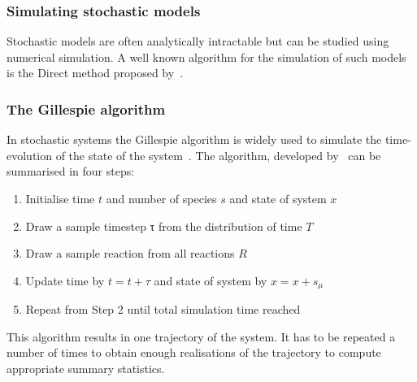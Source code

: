 
\subsubsection{Simulating stochastic models}

Stochastic models are often analytically intractable but can be studied using numerical simulation. A well known algorithm for the simulation of such models is the Direct method proposed by~\textcite{Gillespie:1977ww}.



\subsubsection{The Gillespie algorithm}
 In stochastic systems the Gillespie algorithm is widely used to simulate the time-evolution of the state of the system~\autocite{Wilkinson:2006td}. The algorithm, developed by~\textcite{Gillespie:1977ww} can be summarised in four steps:
\begin{enumerate}
\item Initialise time $t$ and number of species $s$ and state of system $x$
\item Draw a sample timestep τ from the distribution of time $Τ$
\item Draw a sample reaction from all reactions $R$
\item Update time by $t = t + τ$ and state of system by $x = x + s_μ$
\item Repeat from Step 2 until total simulation time reached
\end{enumerate}
   
\noindent This algorithm results in one trajectory of the system. It has to be repeated a number of times to obtain enough realisations of the trajectory to compute appropriate summary statistics.

